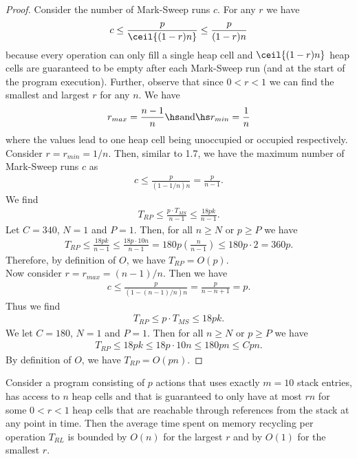 \documentclass{article}
\begin{document}
\begin{proof}
	Consider the number of Mark-Sweep runs $c$. For any $r$ we have
	\begin{align*}
		c \leq \frac{p}{\ceil{(1-r)n}}\leq \frac{p}{(1-r)n}
	\end{align*}
	because every operation can only fill a single heap cell and $\ceil{(1-r)n}$
	heap cells are guaranteed to be empty after each Mark-Sweep run
	(and at the start of the program execution). Further, observe that
	since $0<r<1$ we can find the smallest and largest $r$ for any $n$. We have
	\begin{align}
		\label{rlims}
		r_{max} = \frac{n-1}{n} \hs\text{and}\hs r_{min} = \frac{1}{n}
	\end{align}
	where the values lead to one heap cell being unoccupied or occupied respectively.\\
	Consider $r=r_{min}=1/n$. Then, similar to 1.7, we have the maximum number of Mark-Sweep
	runs $c$ as
	\begin{align*}
		c \leq \frac{p}{\left(1-1/n\right)n}=\frac{p}{n-1}.
	\end{align*}
	We find
	\begin{align*}
		T_{RP} \leq \frac{p\cdot T_{MS}}{n-1} \leq \frac{18pk}{n-1}.
	\end{align*}
	Let $C=340$, $N=1$ and $P=1$. Then, for all $n\geq N$ or $p\geq P$ we have
	\begin{align*}
		T_{RP} \leq \frac{18pk}{n-1} \leq \frac{18p\cdot 10n}{n-1} = 180p\left(\frac{n}{n-1}\right)
		\leq 180p\cdot 2 = 360p.
	\end{align*}
	Therefore, by definition of $O$, we have $T_{RP}=O(p)$.\\
	Now consider $r=r_{max}=(n-1)/n$. Then we have
	\begin{align}
		\label{cmax}
		c\leq \frac{p}{(1-(n-1)/n)n} = \frac{p}{n-n+1} = p.
	\end{align}
	Thus we find
	\begin{align*}
		T_{RP} \leq p\cdot T_{MS} \leq 18pk.
	\end{align*}
	We let $C=180$, $N=1$ and $P=1$. Then for all $n\geq N$ or $p\geq P$ we have
	\begin{align*}
		T_{RP} \leq 18pk \leq 18p \cdot 10n \leq 180pn \leq Cpn.
	\end{align*}
	By definition of $O$, we have $T_{RP}=O(pn)$.
\end{proof}


\begin{claim}
	Consider a program consisting of $p$ actions that uses exactly $m=10$
	stack entries, has access to $n$ heap cells and that is guaranteed to only
	have at most $rn$ for some $0<r<1$ heap cells that are reachable through references
	from the stack at any point in time.
	Then the average time spent on memory recycling per operation $T_{RL}$ is bounded by $O(n)$ for
	the largest $r$ and by $O(1)$ for the smallest $r$.
\end{claim}
\end{document}
